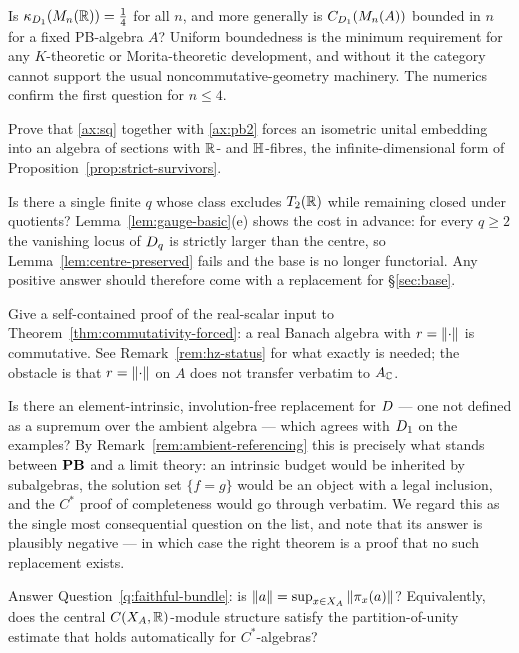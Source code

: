 \begin{problem}\label{prob:matrix-stability}
Is $\kappa_{D_1}(M_n(\mathbb{R}))=\tfrac14$ for all $n$, and more generally is
$C_{D_1}(M_n(A))$ bounded in $n$ for a fixed PB-algebra $A$?  Uniform
boundedness is the minimum requirement for any $K$-theoretic or Morita-theoretic
development, and without it the category cannot support the usual
noncommutative-geometry machinery.  The numerics confirm the first question for
$n\le4$.
\end{problem}

\begin{problem}\label{prob:quaternionic-sw}
Prove that \eqref{ax:sq} together with \eqref{ax:pb2} forces an isometric
unital embedding into an algebra of sections with $\mathbb{R}$- and $\mathbb{H}$-fibres, the
infinite-dimensional form of Proposition~\ref{prop:strict-survivors}.
\end{problem}

\begin{problem}\label{prob:finite-q}
Is there a single finite $q$ whose class excludes $T_2(\mathbb{R})$ while remaining
closed under quotients?  Lemma~\ref{lem:gauge-basic}(e) shows the cost in
advance: for every $q\ge2$ the vanishing locus of $D_q$ is strictly larger
than the centre, so Lemma~\ref{lem:centre-preserved} fails and the base is no
longer functorial.  Any positive answer should therefore come with a
replacement for \S\ref{sec:base}.
\end{problem}

\begin{problem}\label{prob:real-hz}
Give a self-contained proof of the real-scalar input to
Theorem~\ref{thm:commutativity-forced}: a real Banach algebra with
$r=\left\lVert\cdot\right\rVert$ is commutative.  See Remark~\ref{rem:hz-status} for what
exactly is needed; the obstacle is that $r=\left\lVert\cdot\right\rVert$ on $A$ does not
transfer verbatim to $A_{\mathbb{C}}$.
\end{problem}

\begin{problem}\label{prob:intrinsic}
Is there an element-intrinsic, involution-free replacement for $D$ --- one
not defined as a supremum over the ambient algebra --- which agrees with
$D_1$ on the examples?  By Remark~\ref{rem:ambient-referencing} this is
precisely what stands between $\mathbf{PB}$ and a limit theory: an intrinsic budget
would be inherited by subalgebras, the solution set $\{f=g\}$ would be an
object with a legal inclusion, and the $C^*$ proof of completeness would go
through verbatim.  We regard this as the single most consequential question on
the list, and note that its answer is plausibly negative --- in which case the
right theorem is a proof that no such replacement exists.
\end{problem}

\begin{problem}\label{prob:faithful}
Answer Question~\ref{q:faithful-bundle}: is
$\left\lVert a\right\rVert=\sup_{x\in X_A}\left\lVert\pi_x(a)\right\rVert$?  Equivalently, does the central
$C(X_A,\mathbb{R})$-module structure satisfy the partition-of-unity estimate that
holds automatically for $C^*$-algebras?
\end{problem}
